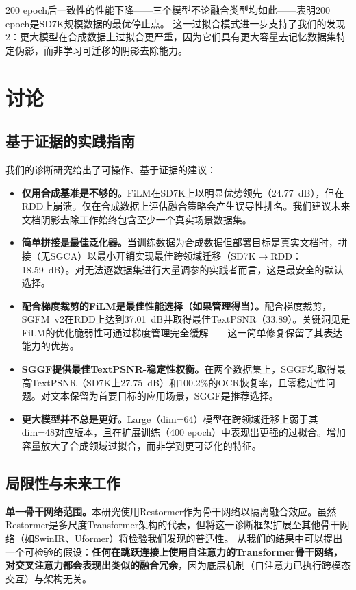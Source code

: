 \documentclass[11pt]{ctexart}
\begin{document}
200 epoch后一致性的性能下降——三个模型不论融合类型均如此——表明200 epoch是SD7K规模数据的最优停止点。
这一过拟合模式进一步支持了我们的发现2：更大模型在合成数据上过拟合更严重，因为它们具有更大容量去记忆数据集特定伪影，而非学习可迁移的阴影去除能力。

\section{讨论}

\subsection{基于证据的实践指南}

我们的诊断研究给出了可操作、基于证据的建议：

\begin{itemize}
  \item \textbf{仅用合成基准是不够的。}FiLM在SD7K上以明显优势领先（24.77~dB），但在RDD上崩溃。仅在合成数据上评估融合策略会产生误导性排名。我们建议未来文档阴影去除工作始终包含至少一个真实场景数据集。
  \item \textbf{简单拼接是最佳泛化器。}当训练数据为合成数据但部署目标是真实文档时，拼接（无SGCA）以最小开销实现最佳跨领域迁移（SD7K$\rightarrow$RDD：18.59~dB）。对无法逐数据集进行大量调参的实践者而言，这是最安全的默认选择。
  \item \textbf{配合梯度裁剪的FiLM是最佳性能选择（如果管理得当）。}配合梯度裁剪，SGFM~v2在RDD上达到37.01~dB并取得最佳TextPSNR（33.89）。关键洞见是FiLM的优化脆弱性可通过梯度管理完全缓解——这一简单修复保留了其表达能力的优势。
  \item \textbf{SGGF提供最佳TextPSNR-稳定性权衡。}在两个数据集上，SGGF均取得最高TextPSNR（SD7K上27.75~dB）和100.2\%的OCR恢复率，且零稳定性问题。对文本保留为首要目标的应用场景，SGGF是推荐选择。
  \item \textbf{更大模型并不总是更好。}Large（dim=64）模型在跨领域迁移上弱于其dim=48对应版本，且在扩展训练（400 epoch）中表现出更强的过拟合。增加容量放大了合成领域过拟合，而非学到更可泛化的特征。
\end{itemize}

\subsection{局限性与未来工作}

\textbf{单一骨干网络范围。}本研究使用Restormer作为骨干网络以隔离融合效应。虽然Restormer是多尺度Transformer架构的代表，但将这一诊断框架扩展至其他骨干网络（如SwinIR、Uformer）将检验我们发现的普适性。
从我们的结果中可以提出一个可检验的假设：\textbf{任何在跳跃连接上使用自注意力的Transformer骨干网络，对交叉注意力都会表现出类似的融合冗余}，因为底层机制（自注意力已执行跨模态交互）与架构无关。
\end{document}
